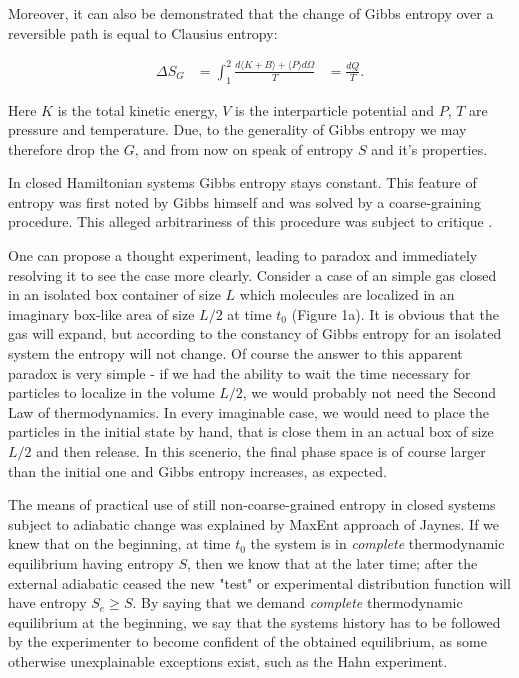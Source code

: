 \documentclass[a4paper,12pt]{article}
\begin{document}
Moreover, it can also be demonstrated\cite{Jaynes:1965gg} that the change of Gibbs entropy over a reversible path is equal to Clausius entropy:

\begin{equation}
\begin{aligned}
  \Delta S_G &= \int_1^2 \frac{d\langle K+ B \rangle+ \langle P \rangle d\Omega}{T}
  &= \frac{dQ}{T}.
\end{aligned}
\end{equation}

Here $K$ is the total kinetic energy, $V$ is the interparticle potential and $P$, $T$ are pressure and temperature. 
Due, to the generality of Gibbs entropy we may therefore drop the $G$, and from now on speak of entropy $S$ and it's properties.

In closed Hamiltonian systems Gibbs entropy stays constant.
This feature of entropy was first noted by Gibbs himself and was solved by a coarse-graining procedure\cite{Gibbs:1928tw}. This alleged arbitrariness of this procedure was subject to critique \cite{Evans:2241458}. %

One can propose a thought experiment, leading to paradox and immediately resolving it to see the case more clearly. Consider a case of an simple gas closed in an isolated box container of size $L$ which molecules are localized in an imaginary box-like area of size $L/2$ at time $t_0$ (Figure 1a). %
It is obvious that the gas will expand, but according to the constancy of Gibbs entropy for an isolated system the entropy will not change. Of course the answer to this apparent paradox is very simple - if we had the ability to wait the time necessary for particles to localize in the volume $L/2$, we would probably not need the Second Law of thermodynamics. In every imaginable case, we  would need to place the particles in the initial state by hand, that is close them in an actual box of size $L/2$ and then release. 
In this scenerio, the final phase space is of course larger than the initial one and Gibbs entropy increases, as expected.

The means of practical use of still non-coarse-grained entropy in closed systems subject to adiabatic change was explained by MaxEnt approach of Jaynes\cite{Jaynes:1965gg}. If we knew that on the beginning, at time $t_0$ the system is in \textit{complete} thermodynamic equilibrium having entropy $S$, then we know that at the later time; after the external adiabatic ceased the new "test" or experimental distribution function will have entropy $S_e \geq S$. By saying that we demand \textit{complete} thermodynamic equilibrium at the beginning, we say that the systems history has to be followed by the experimenter to become confident of the obtained equilibrium, as some otherwise unexplainable exceptions exist, such as the Hahn experiment. %
\end{document}
